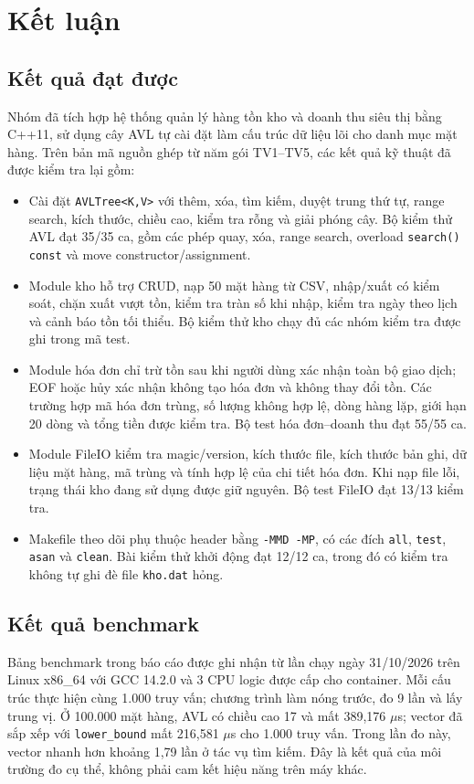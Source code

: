 \chapter*{Kết luận}

\section*{Kết quả đạt được}
Nhóm đã tích hợp hệ thống quản lý hàng tồn kho và doanh thu siêu thị bằng C++11, sử dụng cây AVL tự cài đặt làm cấu trúc dữ liệu lõi cho danh mục mặt hàng. Trên bản mã nguồn ghép từ năm gói TV1--TV5, các kết quả kỹ thuật đã được kiểm tra lại gồm:
\begin{itemize}
  \item Cài đặt \texttt{AVLTree<K,V>} với thêm, xóa, tìm kiếm, duyệt trung thứ tự, range search, kích thước, chiều cao, kiểm tra rỗng và giải phóng cây. Bộ kiểm thử AVL đạt 35/35 ca, gồm các phép quay, xóa, range search, overload \texttt{search() const} và move constructor/assignment.
  \item Module kho hỗ trợ CRUD, nạp 50 mặt hàng từ CSV, nhập/xuất có kiểm soát, chặn xuất vượt tồn, kiểm tra tràn số khi nhập, kiểm tra ngày theo lịch và cảnh báo tồn tối thiểu. Bộ kiểm thử kho chạy đủ các nhóm kiểm tra được ghi trong mã test.
  \item Module hóa đơn chỉ trừ tồn sau khi người dùng xác nhận toàn bộ giao dịch; EOF hoặc hủy xác nhận không tạo hóa đơn và không thay đổi tồn. Các trường hợp mã hóa đơn trùng, số lượng không hợp lệ, dòng hàng lặp, giới hạn 20 dòng và tổng tiền được kiểm tra. Bộ test hóa đơn--doanh thu đạt 55/55 ca.
  \item Module FileIO kiểm tra magic/version, kích thước file, kích thước bản ghi, dữ liệu mặt hàng, mã trùng và tính hợp lệ của chi tiết hóa đơn. Khi nạp file lỗi, trạng thái kho đang sử dụng được giữ nguyên. Bộ test FileIO đạt 13/13 kiểm tra.
  \item Makefile theo dõi phụ thuộc header bằng \texttt{-MMD -MP}, có các đích \texttt{all}, \texttt{test}, \texttt{asan} và \texttt{clean}. Bài kiểm thử khởi động đạt 12/12 ca, trong đó có kiểm tra không tự ghi đè file \texttt{kho.dat} hỏng.
\end{itemize}

\section*{Kết quả benchmark}
Bảng benchmark trong báo cáo được ghi nhận từ lần chạy ngày 31/10/2026 trên Linux x86\_64 với GCC 14.2.0 và 3 CPU logic được cấp cho container. Mỗi cấu trúc thực hiện cùng 1.000 truy vấn; chương trình làm nóng trước, đo 9 lần và lấy trung vị. Ở 100.000 mặt hàng, AVL có chiều cao 17 và mất 389,176 $\mu$s; vector đã sắp xếp với \texttt{lower\_bound} mất 216,581 $\mu$s cho 1.000 truy vấn. Trong lần đo này, vector nhanh hơn khoảng 1,79 lần ở tác vụ tìm kiếm. Đây là kết quả của môi trường đo cụ thể, không phải cam kết hiệu năng trên máy khác.

